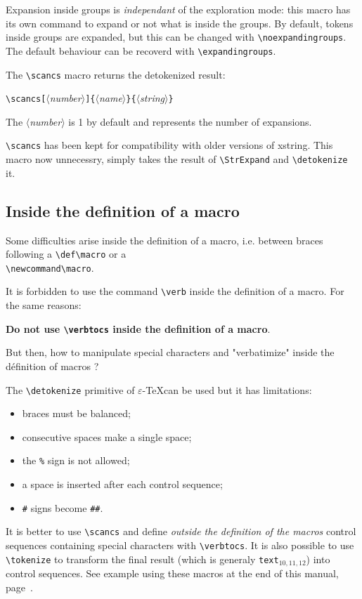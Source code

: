 \documentclass[a4paper,10pt]{article}
\newcommand\argu[1]{$\langle$\textit{#1}$\rangle$}
\newcommand\ARGU[1]{\texttt{\{}\argu{#1}\texttt{\}}}
\newcommand\arguC[1]{\texttt{[}\argu{#1}\texttt{]}}
\newcommand\texte[1]{\texttt{text}${}_{#1}$}
\newcommand\Xstring{\textsf{xstring}\xspace}
\newcommand\verbinline{\lstinline[basicstyle=\normalsize\ttfamily]}
\begin{document}
Expansion inside groups is \emph{independant} of the exploration mode: this macro has its own command to expand or not what is inside the groups. By default, tokens inside groups are expanded, but this can be changed with \verbinline-\noexpandingroups-. The default behaviour can be recoverd with \verbinline-\expandingroups-.\bigskip

The \verbinline-\scancs- macro returns the detokenized result:\par\nobreak\medskip
\verbinline|\scancs|\arguC{number}\ARGU{name}\ARGU{string}\par\nobreak\smallskip
The \argu{number} is 1 by default and represents the number of expansions.\smallskip

\verbinline-\scancs-  has been kept for compatibility with older versions of \Xstring. This macro now unnecessry, simply takes the result of \verbinline|\StrExpand| and \verbinline|\detokenize| it.

\subsection{Inside the definition of a macro}
Some difficulties arise inside the definition of a macro, i.e. between braces following a \verbinline|\def\macro| or a\\\verbinline|\newcommand\macro|.\medskip

It is forbidden to use the command \verbinline|\verb| inside the definition of a macro. For the same reasons:\par\medskip
\hfill\textbf{Do not use \texttt{\textbackslash verbtocs} inside the definition of a macro}.\hfill{}\medskip

But then, how to manipulate special characters and "verbatimize" inside the définition of macros ?\bigskip

The \verbinline|\detokenize| primitive of $\varepsilon$-\TeX can be used but it has limitations:
\begin{itemize}
	\item braces must be balanced;
	\item consecutive spaces make a single space;
	\item the \verb|%| sign is not allowed;
	\item a space is inserted after each control sequence;
	\item \verb|#| signs become  \verb|##|.
\end{itemize}
\medskip

It is better to use \verbinline|\scancs| and define \emph{outside the definition of the macros} control sequences containing special characters with \verbinline|\verbtocs|. It is also possible to use \verbinline|\tokenize| to transform the final result (which is generaly \texte{10,11,12}) into control sequences. See example using these macros at the end of this manual, page~\pageref{exemples}.\medskip
\end{document}
